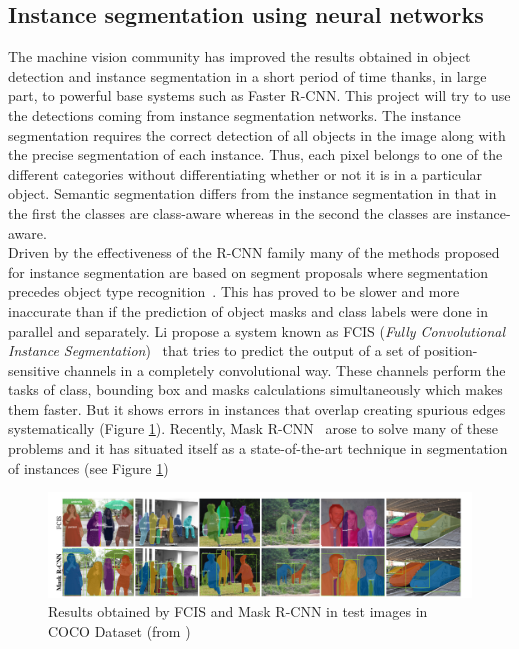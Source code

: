 \subsection{Instance segmentation using neural networks}
The machine vision community has improved the results obtained in object detection and instance segmentation in a short period of time thanks, in large part, to powerful base systems such as Faster R-CNN. This project will try to use the detections coming from instance segmentation networks. The instance segmentation requires the correct detection of all objects in the image along with the precise segmentation of each instance. Thus, each pixel belongs to one of the different categories without differentiating whether or not it is in a particular object. Semantic segmentation differs from the instance segmentation in that in the first the classes are class-aware whereas in the second the classes are instance-aware.\\
Driven by the effectiveness of the R-CNN family many of the methods proposed for instance segmentation are based on segment proposals where segmentation precedes object type recognition~\cite{pinheiro2015learning}. This has proved to be slower and more inaccurate than if the prediction of object masks and class labels were done in parallel and separately. Li \etal{}propose a system known as FCIS (\textit{Fully Convolutional Instance Segmentation})~\cite{li2016fully} that tries to predict the output of a set of position-sensitive channels in a completely convolutional way. These channels perform the tasks of class, bounding box and masks calculations simultaneously which makes them faster. But it shows errors in instances that overlap creating spurious edges systematically (Figure \ref{fig:fcis_mask}).
Recently, Mask R-CNN~\cite{he2017mask} arose to solve many of these problems and it has situated itself as a state-of-the-art technique in segmentation of instances (see Figure \ref{fig:fcis_mask})\\
\begin{figure}[H]
\begin{center}
\includegraphics[scale=0.35]{previous_version/fcis_vs_maskrcnn.png}
\caption{Results obtained by FCIS and Mask R-CNN in test images in COCO Dataset (from \cite{he2017mask})}
\label{fig:fcis_mask}
\end{center}
\end{figure}
